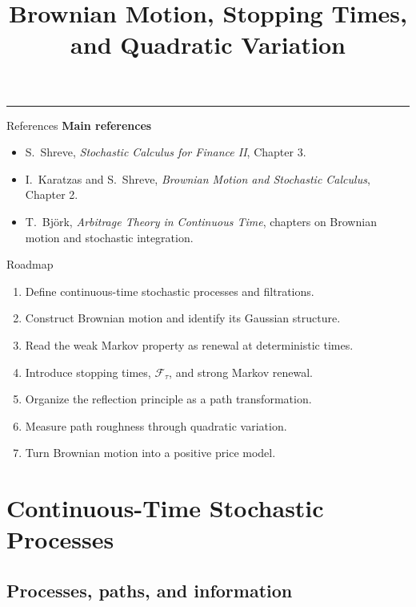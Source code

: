\documentclass[10pt,aspectratio=169]{beamer}
\title{Brownian Motion, Stopping Times, and Quadratic Variation}
\author{}
\date{}
\newcommand{\F}{\mathcal F}
\begin{document}
\begin{frame}[plain]
  \vfill
  {\inserttitle\par}
  \medskip
  {\color{BootcampBlueDark}\rule{0.95\textwidth}{0.8pt}}
  \vfill
\end{frame}

\begin{frame}{References}
\footnotesize
\textbf{Main references}
\begin{itemize}\setlength{\itemsep}{0.5em}
  \item S.~Shreve, \emph{Stochastic Calculus for Finance II}, Chapter 3.
  \item I.~Karatzas and S.~Shreve, \emph{Brownian Motion and Stochastic Calculus}, Chapter 2.
  \item T.~Bj\"ork, \emph{Arbitrage Theory in Continuous Time}, chapters on Brownian motion and stochastic integration.
\end{itemize}
\end{frame}

\begin{frame}{Roadmap}
\begin{enumerate}\setlength{\itemsep}{0.45em}
  \item Define continuous-time stochastic processes and filtrations.
  \item Construct Brownian motion and identify its Gaussian structure.
  \item Read the weak Markov property as renewal at deterministic times.
  \item Introduce stopping times, \(\F_\tau\), and strong Markov renewal.
  \item Organize the reflection principle as a path transformation.
  \item Measure path roughness through quadratic variation.
  \item Turn Brownian motion into a positive price model.
\end{enumerate}
\end{frame}

\section{Continuous-Time Stochastic Processes}
\subsection{Processes, paths, and information}
\end{document}
